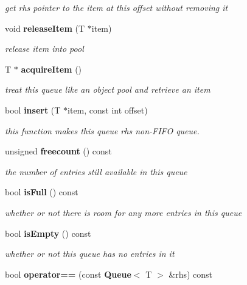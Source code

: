 \begin{DoxyCompactItemize}
\begin{DoxyCompactList}\small\item\em get rhs pointer to the item at this offset without removing it \item\end{DoxyCompactList}\item 
void {\bf releaseItem} (T $\ast$item)
\begin{DoxyCompactList}\small\item\em release item into pool \item\end{DoxyCompactList}\item 
T $\ast$ {\bf acquireItem} ()
\begin{DoxyCompactList}\small\item\em treat this queue like an object pool and retrieve an item \item\end{DoxyCompactList}\item 
bool {\bf insert} (T $\ast$item, const int offset)
\begin{DoxyCompactList}\small\item\em this function makes this queue rhs non-\/FIFO queue. \item\end{DoxyCompactList}\item 
unsigned {\bf freecount} () const \label{class_d_r_a_msim_i_i_1_1_queue_a22574a49b87fd67dda5a0c1cea9235a8}

\begin{DoxyCompactList}\small\item\em the number of entries still available in this queue \item\end{DoxyCompactList}\item 
bool {\bf isFull} () const \label{class_d_r_a_msim_i_i_1_1_queue_a5dd28855c0ff9c2a5b332592948ec0ef}

\begin{DoxyCompactList}\small\item\em whether or not there is room for any more entries in this queue \item\end{DoxyCompactList}\item 
bool {\bf isEmpty} () const \label{class_d_r_a_msim_i_i_1_1_queue_a7a2a856af27f9979d2d20c7e3156eb05}

\begin{DoxyCompactList}\small\item\em whether or not this queue has no entries in it \item\end{DoxyCompactList}\item 
bool {\bf operator==} (const {\bf Queue}$<$ T $>$ \&rhs) const \label{class_d_r_a_msim_i_i_1_1_queue_a5a9c567e37a285618531b6f2a6fb6aa1}


\end{DoxyCompactItemize}
